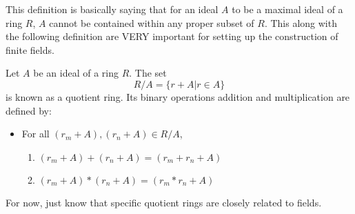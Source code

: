 This definition is basically saying that for an ideal $A$ to be a maximal ideal of a ring $R$, $A$ cannot be contained within any proper subset of $R$. This along with the following definition are VERY important for setting up the construction of finite fields.

\begin{definition}
Let $A$ be an ideal of a ring $R$. The set $$R/A = \{r + A | r \in A\}$$ is known as a quotient ring. Its binary operations addition and multiplication are defined by:
\begin{itemize}
    \item For all $(r_m + A), (r_n + A) \in R/A$,

\begin{enumerate}
    \item $(r_m + A) + (r_n + A) = (r_m + r_n + A)$
    \item $(r_m + A)*(r_n + A) = (r_m*r_n + A)$
\end{enumerate}
\end{itemize}
\end{definition}

For now, just know that specific quotient rings are closely related to fields.





